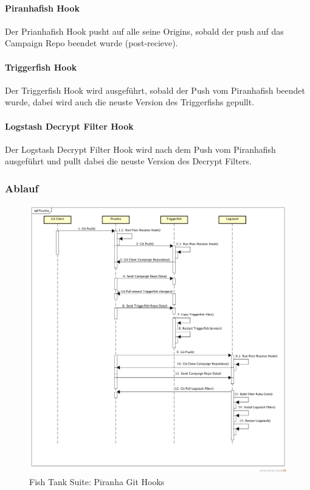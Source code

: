 \paragraph{Piranhafish Hook} Der Prianhafish Hook pusht auf alle seine Origins, sobald der push auf das Campaign Repo beendet wurde (post-recieve).


\paragraph{Triggerfish Hook} Der Triggerfish Hook wird ausgeführt, sobald der Push vom Piranhafish beendet wurde, dabei wird auch die neuste Version des Triggerfishs gepullt.

\paragraph{Logstash Decrypt Filter Hook} Der Logstash Decrypt Filter Hook wird nach dem Push vom Piranhafish ausgeführt und pullt dabei die neuste Version des Decrypt Filters.

\subsubsection{Ablauf}

\begin{figure}[H]
	\centering
	\includegraphics[width=\textwidth]{img/PiranhaSequenceDiagram.png}
	\caption{Fish Tank Suite: Piranha Git Hooks}
	\label{fig:piranha-git-hooks}
\end{figure}



